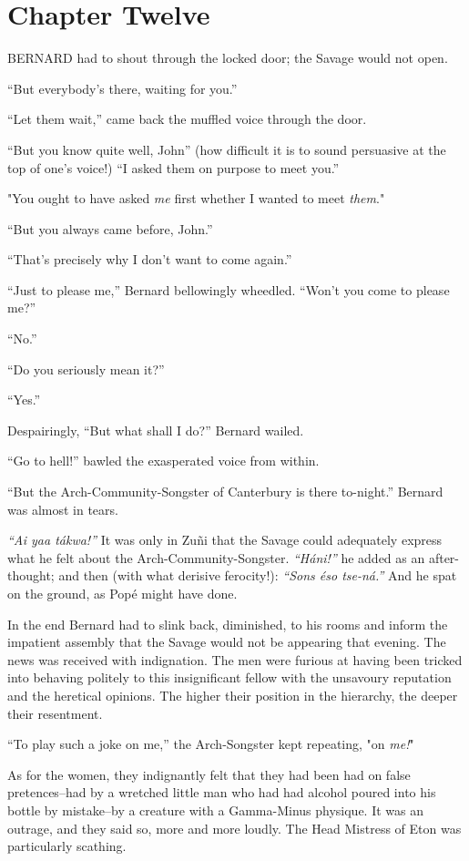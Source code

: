 \documentclass[12pt]{report}
\newcommand{\mychapter}[2]{
\setcounter{chapter}{#1}
    \setcounter{section}{0}
    \chapter*{#2}
    \addcontentsline{toc}{chapter}{#2}
}
\begin{document}
\mychapter{12}{Chapter Twelve}
BERNARD had to shout through the locked door; the Savage would not open.

``But everybody's there, waiting for you.''

``Let them wait,'' came back the muffled voice through the door.

``But you know quite well, John'' (how difficult it is to sound
persuasive at the top of one's voice!) ``I asked them on purpose to meet
you.''

"You ought to have asked \emph{me} first whether I wanted to meet
\emph{them}."

``But you always came before, John.''

``That's precisely why I don't want to come again.''

``Just to please me,'' Bernard bellowingly wheedled. ``Won't you come to
please me?''

``No.''

``Do you seriously mean it?''

``Yes.''

Despairingly, ``But what shall I do?'' Bernard wailed.

``Go to hell!'' bawled the exasperated voice from within.

``But the Arch-Community-Songster of Canterbury is there to-night.''
Bernard was almost in tears.

\emph{``Ai yaa tákwa!''} It was only in Zuñi that the Savage could
adequately express what he felt about the Arch-Community-Songster.
\emph{``Háni!''} he added as an after-thought; and then (with what
derisive ferocity!): \emph{``Sons éso tse-ná.''} And he spat on the
ground, as Popé might have done.

In the end Bernard had to slink back, diminished, to his rooms and
inform the impatient assembly that the Savage would not be appearing
that evening. The news was received with indignation. The men were
furious at having been tricked into behaving politely to this
insignificant fellow with the unsavoury reputation and the heretical
opinions. The higher their position in the hierarchy, the deeper their
resentment.

``To play such a joke on me,'' the Arch-Songster kept repeating, "on
\emph{me!}"

As for the women, they indignantly felt that they had been had on false
pretences--had by a wretched little man who had had alcohol poured into
his bottle by mistake--by a creature with a Gamma-Minus physique. It was
an outrage, and they said so, more and more loudly. The Head Mistress of
Eton was particularly scathing.
\end{document}

